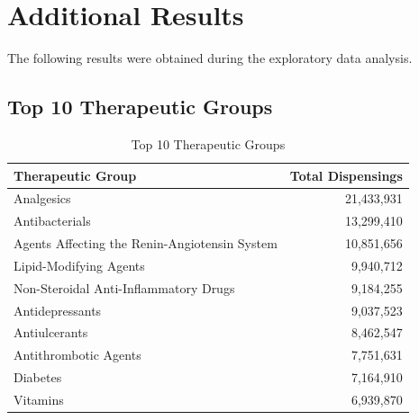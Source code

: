 \documentclass[11pt,a4paper]{report}
\begin{document}
\appendix

\chapter{Additional Results}

The following results were obtained during the exploratory data analysis.

\section{Top 10 Therapeutic Groups}

\begin{table}[H]
\centering
\caption{Top 10 Therapeutic Groups}
\label{tab:top10}
\begin{tabular}{lr}
\toprule
\textbf{Therapeutic Group} & \textbf{Total Dispensings} \\
\midrule
Analgesics & 21,433,931 \\
Antibacterials & 13,299,410 \\
Agents Affecting the Renin-Angiotensin System & 10,851,656 \\
Lipid-Modifying Agents & 9,940,712 \\
Non-Steroidal Anti-Inflammatory Drugs & 9,184,255 \\
Antidepressants & 9,037,523 \\
Antiulcerants & 8,462,547 \\
Antithrombotic Agents & 7,751,631 \\
Diabetes & 7,164,910 \\
Vitamins & 6,939,870 \\
\bottomrule
\end{tabular}
\end{table}
\end{document}
